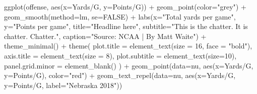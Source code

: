 \documentclass[
]{book}
\newenvironment{Shaded}{\begin{snugshade}}{\end{snugshade}}
\newcommand{\AttributeTok}[1]{\textcolor[rgb]{0.77,0.63,0.00}{#1}}
\newcommand{\ConstantTok}[1]{\textcolor[rgb]{0.00,0.00,0.00}{#1}}
\newcommand{\DecValTok}[1]{\textcolor[rgb]{0.00,0.00,0.81}{#1}}
\newcommand{\FunctionTok}[1]{\textcolor[rgb]{0.00,0.00,0.00}{#1}}
\newcommand{\NormalTok}[1]{#1}
\newcommand{\SpecialCharTok}[1]{\textcolor[rgb]{0.00,0.00,0.00}{#1}}
\newcommand{\StringTok}[1]{\textcolor[rgb]{0.31,0.60,0.02}{#1}}
\begin{document}
\begin{Shaded}
\begin{Highlighting}[]
\FunctionTok{ggplot}\NormalTok{(offense, }\FunctionTok{aes}\NormalTok{(}\AttributeTok{x=}\StringTok{\textasciigrave{}}\AttributeTok{Yards/G}\StringTok{\textasciigrave{}}\NormalTok{, }\AttributeTok{y=}\StringTok{\textasciigrave{}}\AttributeTok{Points/G}\StringTok{\textasciigrave{}}\NormalTok{)) }\SpecialCharTok{+} 
  \FunctionTok{geom\_point}\NormalTok{(}\AttributeTok{color=}\StringTok{"grey"}\NormalTok{) }\SpecialCharTok{+} \FunctionTok{geom\_smooth}\NormalTok{(}\AttributeTok{method=}\NormalTok{lm, }\AttributeTok{se=}\ConstantTok{FALSE}\NormalTok{) }\SpecialCharTok{+} 
  \FunctionTok{labs}\NormalTok{(}\AttributeTok{x=}\StringTok{"Total yards per game"}\NormalTok{, }\AttributeTok{y=}\StringTok{"Points per game"}\NormalTok{, }\AttributeTok{title=}\StringTok{"Headline here"}\NormalTok{, }\AttributeTok{subtitle=}\StringTok{"This is the chatter. It is chatter. Chatter."}\NormalTok{, }\AttributeTok{caption=}\StringTok{"Source: NCAA | By Matt Waite"}\NormalTok{) }\SpecialCharTok{+} 
  \FunctionTok{theme\_minimal}\NormalTok{() }\SpecialCharTok{+} 
  \FunctionTok{theme}\NormalTok{(}
    \AttributeTok{plot.title =} \FunctionTok{element\_text}\NormalTok{(}\AttributeTok{size =} \DecValTok{16}\NormalTok{, }\AttributeTok{face =} \StringTok{"bold"}\NormalTok{),}
    \AttributeTok{axis.title =} \FunctionTok{element\_text}\NormalTok{(}\AttributeTok{size =} \DecValTok{8}\NormalTok{), }
    \AttributeTok{plot.subtitle =} \FunctionTok{element\_text}\NormalTok{(}\AttributeTok{size=}\DecValTok{10}\NormalTok{), }
    \AttributeTok{panel.grid.minor =} \FunctionTok{element\_blank}\NormalTok{()}
\NormalTok{    ) }\SpecialCharTok{+}
  \FunctionTok{geom\_point}\NormalTok{(}\AttributeTok{data=}\NormalTok{nu, }\FunctionTok{aes}\NormalTok{(}\AttributeTok{x=}\StringTok{\textasciigrave{}}\AttributeTok{Yards/G}\StringTok{\textasciigrave{}}\NormalTok{, }\AttributeTok{y=}\StringTok{\textasciigrave{}}\AttributeTok{Points/G}\StringTok{\textasciigrave{}}\NormalTok{), }\AttributeTok{color=}\StringTok{"red"}\NormalTok{) }\SpecialCharTok{+} 
  \FunctionTok{geom\_text\_repel}\NormalTok{(}\AttributeTok{data=}\NormalTok{nu, }\FunctionTok{aes}\NormalTok{(}\AttributeTok{x=}\StringTok{\textasciigrave{}}\AttributeTok{Yards/G}\StringTok{\textasciigrave{}}\NormalTok{, }\AttributeTok{y=}\StringTok{\textasciigrave{}}\AttributeTok{Points/G}\StringTok{\textasciigrave{}}\NormalTok{, }\AttributeTok{label=}\StringTok{"Nebraska 2018"}\NormalTok{))}
\end{Highlighting}
\end{Shaded}
\end{document}
